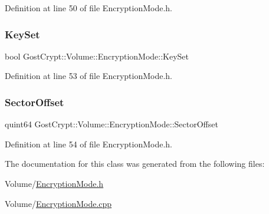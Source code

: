 Definition at line 50 of file Encryption\+Mode.\+h.

\mbox{\label{class_gost_crypt_1_1_volume_1_1_encryption_mode_a261aeaf167fad9fd463868e80c5cbb8c}} 
\subsubsection{\texorpdfstring{Key\+Set}{KeySet}}
{\footnotesize\ttfamily bool Gost\+Crypt\+::\+Volume\+::\+Encryption\+Mode\+::\+Key\+Set\hspace{0.3cm}{\ttfamily [protected]}}



Definition at line 53 of file Encryption\+Mode.\+h.

\mbox{\label{class_gost_crypt_1_1_volume_1_1_encryption_mode_a57d8ea75f9c561594a39180b95ceaf68}} 
\subsubsection{\texorpdfstring{Sector\+Offset}{SectorOffset}}
{\footnotesize\ttfamily quint64 Gost\+Crypt\+::\+Volume\+::\+Encryption\+Mode\+::\+Sector\+Offset\hspace{0.3cm}{\ttfamily [protected]}}



Definition at line 54 of file Encryption\+Mode.\+h.



The documentation for this class was generated from the following files\+:\begin{DoxyCompactItemize}
\item 
Volume/\hyperlink{_encryption_mode_8h}{Encryption\+Mode.\+h}\item 
Volume/\hyperlink{_encryption_mode_8cpp}{Encryption\+Mode.\+cpp}\end{DoxyCompactItemize}
